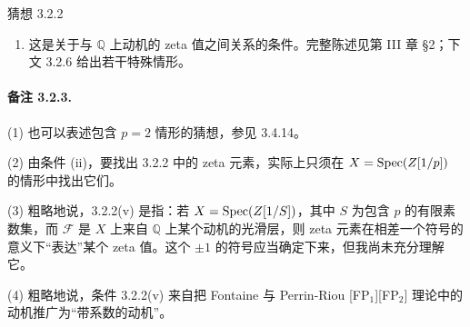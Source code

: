 \begin{statement}{猜想 3.2.2}
\begin{enumerate}[label=(\roman*)]
\begin{equation*}\tag{*}
 0\to\Gamma(X,I^\bullet)\to\Gamma(\overline X,I^\bullet)
 \xrightarrow{1-\sigma_\ell}\Gamma(\overline X,I^\bullet)\to0.
\end{equation*}
这里 $\sigma_\ell$ 为 $\Gal(\overline{\mathbb F}_\ell/\mathbb F_\ell)$ 中的，即对 $x\in\overline{\mathbb F}_\ell$，$\sigma_\ell(x)=x^\ell$。考虑同构
\begin{equation*}\tag{**}
 \Delta_\Lambda(X,\mathcal F)
 \simeq\det_\Lambda R\Gamma(\overline X,\mathcal F)
 \otimes^{\mathbf L}_\Lambda\{\det_\Lambda R\Gamma(\overline X,\mathcal F)\}^{-1}
 \simeq\Lambda.
\end{equation*}
第一个同构由 (*) 给出，第二个由两份 $R\Gamma(\overline X,\mathcal F)$ 间的恒等映射诱导。定义 $z_\Lambda(X,\mathcal F)$ 为 $1\in\Lambda$ 经 (**) 的复合同构所得的像。
\item 这是关于与 $\mathbb Q$ 上动机的 zeta 值之间关系的条件。完整陈述见第 III 章 §2；下文 3.2.6 给出若干特殊情形。
\end{enumerate}
\end{statement}

\paragraph{备注 3.2.3.}
(1) 也可以表述包含 $p=2$ 情形的猜想，参见 3.4.14。

(2) 由条件 (ii)，要找出 3.2.2 中的 zeta 元素，实际上只须在 $X=\operatorname{Spec}(Z[1/p])$ 的情形中找出它们。

(3) 粗略地说，3.2.2(v) 是指：若 $X=\operatorname{Spec}(Z[1/S])$，其中 $S$ 为包含 $p$ 的有限素数集，而 $\mathcal F$ 是 $X$ 上来自 $\mathbb Q$ 上某个动机的光滑层，则 zeta 元素在相差一个符号的意义下“表达”某个 zeta 值。这个 $\pm1$ 的符号应当确定下来，但我尚未充分理解它。

(4) 粗略地说，条件 3.2.2(v) 来自把 Fontaine 与 Perrin-Riou [FP$_1$][FP$_2$] 理论中的动机推广为“带系数的动机”。

